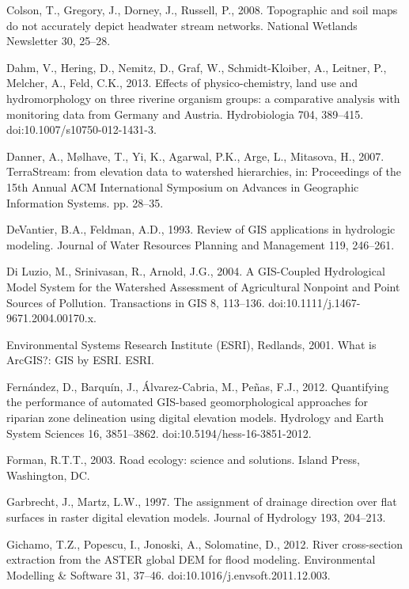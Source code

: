 \begin{thebibliography}
\bibitem{} \hangindent=1cm Colson, T., Gregory, J., Dorney, J., Russell, P., 2008. Topographic and soil maps do not accurately depict headwater stream networks. National Wetlands Newsletter 30, 25–28.

\bibitem{} \hangindent=1cm Dahm, V., Hering, D., Nemitz, D., Graf, W., Schmidt-Kloiber, A., Leitner, P., Melcher, A., Feld, C.K., 2013. Effects of physico-chemistry, land use and hydromorphology on three riverine organism groups: a comparative analysis with monitoring data from Germany and Austria. Hydrobiologia 704, 389–415. doi:10.1007/s10750-012-1431-3.

\bibitem{} \hangindent=1cm Danner, A., Mølhave, T., Yi, K., Agarwal, P.K., Arge, L., Mitasova, H., 2007. TerraStream: from elevation data to watershed hierarchies, in: Proceedings of the 15th Annual ACM International Symposium on Advances in Geographic Information Systems. pp. 28–35.

\bibitem{} \hangindent=1cm DeVantier, B.A., Feldman, A.D., 1993. Review of GIS applications in hydrologic modeling. Journal of Water Resources Planning and Management 119, 246–261.

\bibitem{} \hangindent=1cm Di Luzio, M., Srinivasan, R., Arnold, J.G., 2004. A GIS-Coupled Hydrological Model System for the Watershed Assessment of Agricultural Nonpoint and Point Sources of Pollution. Transactions in GIS 8, 113–136. doi:10.1111/j.1467-9671.2004.00170.x.

\bibitem{} \hangindent=1cm Environmental Systems Research Institute (ESRI), Redlands, 2001. What is ArcGIS?: GIS by ESRI. ESRI.

\bibitem{} \hangindent=1cm Fernández, D., Barquín, J., Álvarez-Cabria, M., Peñas, F.J., 2012. Quantifying the performance of automated GIS-based geomorphological approaches for riparian zone delineation using digital elevation models. Hydrology and Earth System Sciences 16, 3851–3862. doi:10.5194/hess-16-3851-2012.

\bibitem{} \hangindent=1cm Forman, R.T.T., 2003. Road ecology: science and solutions. Island Press, Washington, DC.

\bibitem{} \hangindent=1cm Garbrecht, J., Martz, L.W., 1997. The assignment of drainage direction over flat surfaces in raster digital elevation models. Journal of Hydrology 193, 204–213.

\bibitem{} \hangindent=1cm Gichamo, T.Z., Popescu, I., Jonoski, A., Solomatine, D., 2012. River cross-section extraction from the ASTER global DEM for flood modeling. Environmental Modelling & Software 31, 37–46. doi:10.1016/j.envsoft.2011.12.003.


\end{thebibliography}
